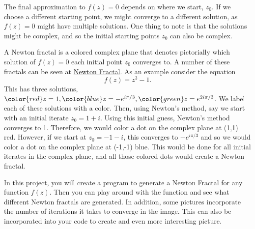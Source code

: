 \documentclass{article}
\def\prog#1{
\vspace{.1in}\begin{mdframed} \begin{center} \textbf{Programming Reminders} \end{center}#1 \end{mdframed} }
\begin{document}
	 The final approximation to $f(z) = 0$ depends on where we start, $z_0$.  If we choose a different starting point, we might converge to a different solution, as $f(z) = 0$ might have multiple solutions.  One thing to note is that the solutions might be complex, and so the initial starting points $z_0$ can also be complex.
	 
	 A Newton fractal is a colored complex plane that denotes pictorially which solution of $f(z) = 0$ each initial point $z_0$ converges to.  A number of these fractals can be seen at {\color{blue}\href{https://en.wikipedia.org/wiki/Newton_fractal}{Newton Fractal}}.  As an example consider the equation 
	 \[ f(z) = z^3 - 1.\]
	 This has three solutions, ${\color{red}z=1}, {\color{blue}z= -e^{i\pi/3}}, {\color{green}z = e^{2i\pi/3}}$.  We label each of these solutions with a color.  Then, using Newton's method, say we start with an initial iterate $z_0 = 1+i$.  Using this initial guess, Newton's method converges to 1.  Therefore, we would color a dot on the complex plane at (1,1) red.  However, if we start at $z_0 = -1-i$, this converges to $-e^{i\pi/3}$ and so we would color a dot on the complex plane at (-1,-1) blue.  This would be done for all initial iterates in the complex plane, and all those colored dots would create a Newton fractal.
	 
	 In this project, you will create a program to generate a Newton Fractal for any function $f(z)$.  Then you can play around with the function and see what different Newton fractals are generated.  In addition, some pictures incorporate the number of iterations it takes to converge in the image.  This can also be incorporated into your code to create and even more interesting picture.


	
	
 
 	
 	
 	
 	
 	
 	
 	

	
	
	
	
	
	
	
	
\end{document}
